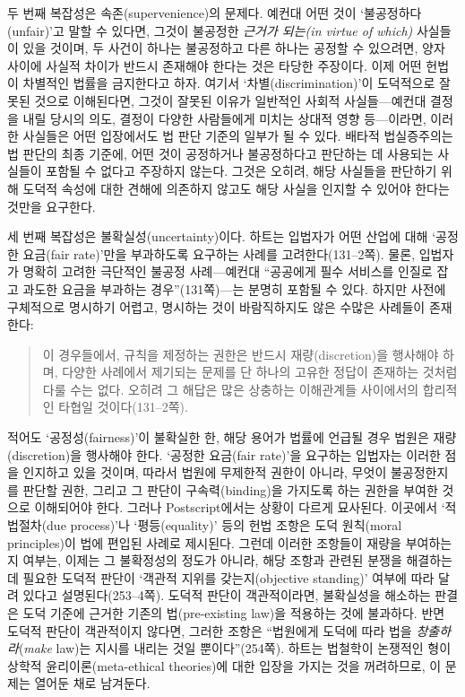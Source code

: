 \documentclass[12pt, oneside]{book}  %
\begin{document}
두 번째 복잡성은 속존(supervenience)의 문제다. 예컨대 어떤 것이
`불공정하다(unfair)'고 말할 수 있다면, 그것이 불공정한 \emph{근거가
되는(in virtue of which)} 사실들이 있을 것이며, 두 사건이 하나는
불공정하고 다른 하나는 공정할 수 있으려면, 양자 사이에 사실적 차이가
반드시 존재해야 한다는 것은 타당한 주장이다. 이제 어떤 헌법이 차별적인
법률을 금지한다고 하자. 여기서 `차별(discrimination)'이 도덕적으로
잘못된 것으로 이해된다면, 그것이 잘못된 이유가 일반적인 사회적
사실들---예컨대 결정을 내릴 당시의 의도, 결정이 다양한 사람들에게 미치는
상대적 영향 등---이라면, 이러한 사실들은 어떤 입장에서도 법 판단 기준의
일부가 될 수 있다. 배타적 법실증주의는 법 판단의 최종 기준에, 어떤 것이
공정하거나 불공정하다고 판단하는 데 사용되는 사실들이 포함될 수 없다고
주장하지 않는다. 그것은 오히려, 해당 사실들을 판단하기 위해 도덕적
속성에 대한 견해에 의존하지 않고도 해당 사실을 인지할 수 있어야 한다는
것만을 요구한다.

세 번째 복잡성은 불확실성(uncertainty)이다. 하트는 입법자가 어떤 산업에
대해 `공정한 요금(fair rate)'만을 부과하도록 요구하는 사례를
고려한다(131--2쪽). 물론, 입법자가 명확히 고려한 극단적인 불공정
사례---예컨대 ``공공에게 필수 서비스를 인질로 잡고 과도한 요금을
부과하는 경우''(131쪽)---는 분명히 포함될 수 있다. 하지만 사전에
구체적으로 명시하기 어렵고, 명시하는 것이 바람직하지도 않은 수많은
사례들이 존재한다:

\begin{quote}
이 경우들에서, 규칙을 제정하는 권한은 반드시 재량(discretion)을 행사해야
하며, 다양한 사례에서 제기되는 문제를 단 하나의 고유한 정답이 존재하는
것처럼 다룰 수는 없다. 오히려 그 해답은 많은 상충하는 이해관계들
사이에서의 합리적인 타협일 것이다(131--2쪽).
\end{quote}

적어도 `공정성(fairness)'이 불확실한 한, 해당 용어가 법률에 언급될 경우
법원은 재량(discretion)을 행사해야 한다. `공정한 요금(fair rate)'을
요구하는 입법자는 이러한 점을 인지하고 있을 것이며, 따라서 법원에
무제한적 권한이 아니라, 무엇이 불공정한지를 판단할 권한, 그리고 그
판단이 구속력(binding)을 가지도록 하는 권한을 부여한 것으로 이해되어야
한다. 그러나 Postscript에서는 상황이 다르게 묘사된다. 이곳에서
`적법절차(due process)'나 `평등(equality)' 등의 헌법 조항은 도덕
원칙(moral principles)이 법에 편입된 사례로 제시된다. 그런데 이러한
조항들이 재량을 부여하는지 여부는, 이제는 그 불확정성의 정도가 아니라,
해당 조항과 관련된 분쟁을 해결하는 데 필요한 도덕적 판단이 `객관적
지위를 갖는지(objective standing)' 여부에 따라 달려 있다고
설명된다(253--4쪽). 도덕적 판단이 객관적이라면, 불확실성을 해소하는
판결은 도덕 기준에 근거한 기존의 법(pre-existing law)을 적용하는 것에
불과하다. 반면 도덕적 판단이 객관적이지 않다면, 그러한 조항은 ``법원에게
도덕에 따라 법을 \emph{창출하라}(\emph{make} law)는 지시를 내리는 것일
뿐이다''(254쪽). 하트는 법철학이 논쟁적인 형이상학적
윤리이론(meta-ethical theories)에 대한 입장을 가지는 것을 꺼려하므로, 이
문제는 열어둔 채로 남겨둔다.
\end{document}
